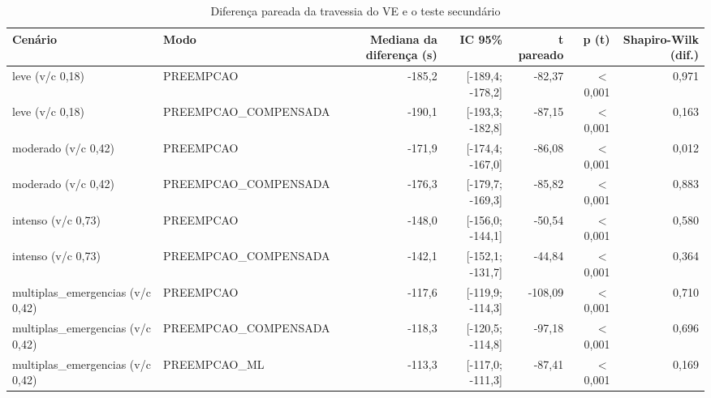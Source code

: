 \begin{table}[htbp]
\centering
\caption{Diferença pareada da travessia do VE e o teste secundário}
\label{tab:t1b}
\small
\begin{tabular}{llrrrrr}
\toprule
Cenário & Modo & Mediana da diferença (s) & IC 95\% & t pareado & p (t) & Shapiro-Wilk (dif.) \\
\midrule
leve (v/c 0,18) & PREEMPCAO & -185,2 & [-189,4; -178,2] & -82,37 & $<$ 0,001 & 0,971 \\
leve (v/c 0,18) & PREEMPCAO\_COMPENSADA & -190,1 & [-193,3; -182,8] & -87,15 & $<$ 0,001 & 0,163 \\
moderado (v/c 0,42) & PREEMPCAO & -171,9 & [-174,4; -167,0] & -86,08 & $<$ 0,001 & 0,012 \\
moderado (v/c 0,42) & PREEMPCAO\_COMPENSADA & -176,3 & [-179,7; -169,3] & -85,82 & $<$ 0,001 & 0,883 \\
intenso (v/c 0,73) & PREEMPCAO & -148,0 & [-156,0; -144,1] & -50,54 & $<$ 0,001 & 0,580 \\
intenso (v/c 0,73) & PREEMPCAO\_COMPENSADA & -142,1 & [-152,1; -131,7] & -44,84 & $<$ 0,001 & 0,364 \\
multiplas\_emergencias (v/c 0,42) & PREEMPCAO & -117,6 & [-119,9; -114,3] & -108,09 & $<$ 0,001 & 0,710 \\
multiplas\_emergencias (v/c 0,42) & PREEMPCAO\_COMPENSADA & -118,3 & [-120,5; -114,8] & -97,18 & $<$ 0,001 & 0,696 \\
multiplas\_emergencias (v/c 0,42) & PREEMPCAO\_ML & -113,3 & [-117,0; -111,3] & -87,41 & $<$ 0,001 & 0,169 \\
\bottomrule
\end{tabular}
\end{table}
